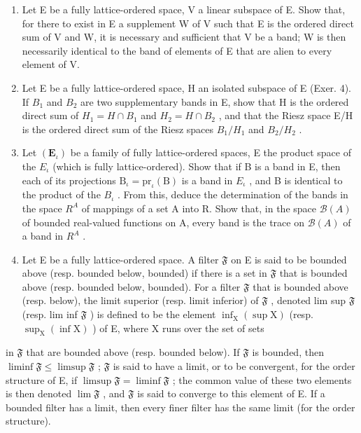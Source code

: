 \begin{enumerate}
\def\labelenumi{\arabic{enumi})}
\setcounter{enumi}{5}
\item
  Let E be a fully lattice-ordered space, V a linear subspace of E. Show that, for there to exist in E a supplement W of V such that E is the ordered direct sum of V and W, it is necessary and sufficient that V be a band; W is then necessarily identical to the band of elements of E that are alien to every element of V.
\item
  Let E be a fully lattice-ordered space, H an isolated subspace of E (Exer. 4). If \(B_{1}\) and \(B_{2}\) are two supplementary bands in E, show that H is the ordered direct sum of \(H_{1}=H\cap B_{1}\) and \(H_{2}=H\cap B_{2}\) , and that the Riesz space E/H is the ordered direct sum of the Riesz spaces \(B_{1}/H_{1}\) and \(B_{2}/H_{2}\) .
\item
  Let \((\mathbf{E}_{\iota})\) be a family of fully lattice-ordered spaces, E the product space of the \(E_{\iota}\) (which is fully lattice-ordered). Show that if B is a band in E, then each of its projections \(\mathrm{B}_{\iota} = \mathrm{pr}_{\iota}(\mathrm{B})\) is a band in \(E_{\iota}\) , and B is identical to the product of the \(B_{\iota}\) . From this, deduce the determination of the bands in the space \(R^{A}\) of mappings of a set A into R. Show that, in the space \(\mathcal{B}(A)\) of bounded real-valued functions on A, every band is the trace on \(\mathcal{B}(A)\) of a band in \(R^{A}\) .
\item
  Let E be a fully lattice-ordered space. A filter \(\mathfrak{F}\) on E is said to be bounded above (resp. bounded below, bounded) if there is a set in \(\mathfrak{F}\) that is bounded above (resp. bounded below, bounded). For a filter \(\mathfrak{F}\) that is bounded above (resp. below), the limit superior (resp. limit inferior) of \(\mathfrak{F}\) , denoted lim sup \(\mathfrak{F}\) (resp. lim inf \(\mathfrak{F}\) ) is defined to be the element \(\inf_{\mathrm{X}}(\sup \mathrm{X})\) (resp. \(\sup_{\mathrm{X}}(\inf \mathrm{X})\) ) of E, where X runs over the set of sets
\end{enumerate}

in \(\mathfrak{F}\) that are bounded above (resp. bounded below). If \(\mathfrak{F}\) is bounded, then \(\liminf\mathfrak{F} \leqslant \limsup\mathfrak{F}\) ; \(\mathfrak{F}\) is said to have a limit, or to be convergent, for the order structure of E, if \(\limsup\mathfrak{F} = \liminf\mathfrak{F}\) ; the common value of these two elements is then denoted \(\lim\mathfrak{F}\) , and \(\mathfrak{F}\) is said to converge to this element of E. If a bounded filter has a limit, then every finer filter has the same limit (for the order structure).

